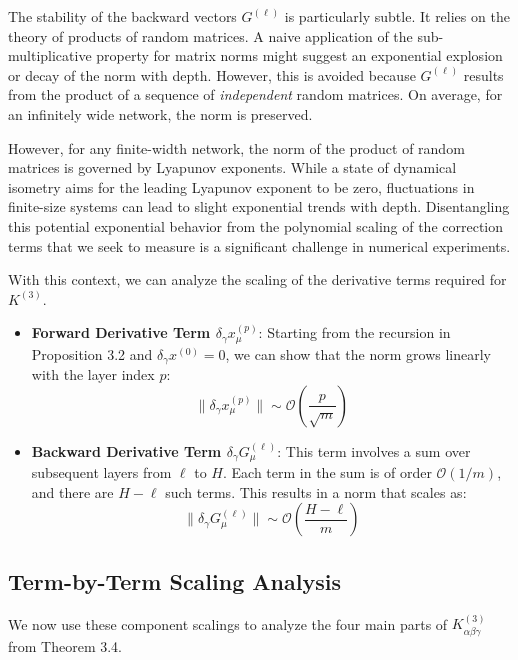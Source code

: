\documentclass{article}
\newcommand{\Order}{\mathcal{O}}
\begin{document}
The stability of the backward vectors $G^{(\ell)}$ is particularly subtle. It relies on the theory of products of random matrices. A naive application of the sub-multiplicative property for matrix norms might suggest an exponential explosion or decay of the norm with depth. However, this is avoided because $G^{(\ell)}$ results from the product of a sequence of \textit{independent} random matrices. On average, for an infinitely wide network, the norm is preserved.

However, for any finite-width network, the norm of the product of random matrices is governed by Lyapunov exponents. While a state of dynamical isometry aims for the leading Lyapunov exponent to be zero, fluctuations in finite-size systems can lead to slight exponential trends with depth. Disentangling this potential exponential behavior from the polynomial scaling of the correction terms that we seek to measure is a significant challenge in numerical experiments.

With this context, we can analyze the scaling of the derivative terms required for $K^{(3)}$.
\begin{itemize}
    \item \textbf{Forward Derivative Term $\delta_\gamma x^{(p)}_\mu$}: Starting from the recursion in Proposition 3.2 and $\delta_\gamma x^{(0)}=0$, we can show that the norm grows linearly with the layer index $p$:
    \[
    \|\delta_\gamma x^{(p)}_\mu\| \sim \Order\left(\frac{p}{\sqrt{m}}\right)
    \]
    \item \textbf{Backward Derivative Term $\delta_\gamma G^{(\ell)}_\mu$}: This term involves a sum over subsequent layers from $\ell$ to $H$. Each term in the sum is of order $\Order(1/m)$, and there are $H-\ell$ such terms. This results in a norm that scales as:
    \[
    \|\delta_\gamma G^{(\ell)}_\mu\| \sim \Order\left(\frac{H-\ell}{m}\right)
    \]
\end{itemize}


\subsection{Term-by-Term Scaling Analysis}
We now use these component scalings to analyze the four main parts of $K^{(3)}_{\alpha\beta\gamma}$ from Theorem 3.4.
\end{document}
